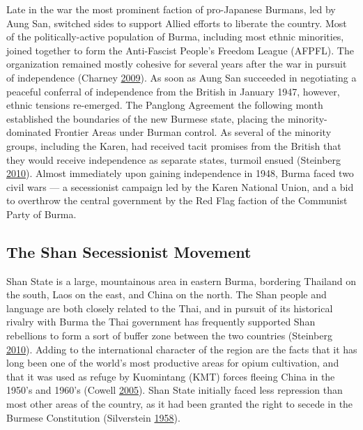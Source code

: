 \documentclass[12pt,]{book}
\theoremstyle{definition}
\theoremstyle{definition}
\theoremstyle{definition}
\theoremstyle{remark}
\begin{document}
Late in the war the most prominent faction of pro-Japanese Burmans, led
by Aung San, switched sides to support Allied efforts to liberate the
country. Most of the politically-active population of Burma, including
most ethnic minorities, joined together to form the Anti-Fascist
People's Freedom League (AFPFL). The organization remained mostly
cohesive for several years after the war in pursuit of independence
(Charney \protect\hyperlink{ref-Charney2009}{2009}). As soon as Aung San
succeeded in negotiating a peaceful conferral of independence from the
British in January 1947, however, ethnic tensions re-emerged. The
Panglong Agreement the following month established the boundaries of the
new Burmese state, placing the minority-dominated Frontier Areas under
Burman control. As several of the minority groups, including the Karen,
had received tacit promises from the British that they would receive
independence as separate states, turmoil ensued (Steinberg
\protect\hyperlink{ref-Steinberg2010}{2010}). Almost immediately upon
gaining independence in 1948, Burma faced two civil wars --- a
secessionist campaign led by the Karen National Union, and a bid to
overthrow the central government by the Red Flag faction of the
Communist Party of Burma.

\hypertarget{the-shan-secessionist-movement}{%
\subsection{The Shan Secessionist
Movement}\label{the-shan-secessionist-movement}}

Shan State is a large, mountainous area in eastern Burma, bordering
Thailand on the south, Laos on the east, and China on the north. The
Shan people and language are both closely related to the Thai, and in
pursuit of its historical rivalry with Burma the Thai government has
frequently supported Shan rebellions to form a sort of buffer zone
between the two countries (Steinberg
\protect\hyperlink{ref-Steinberg2010}{2010}). Adding to the
international character of the region are the facts that it has long
been one of the world's most productive areas for opium cultivation, and
that it was used as refuge by Kuomintang (KMT) forces fleeing China in
the 1950's and 1960's (Cowell \protect\hyperlink{ref-Cowell2005}{2005}).
Shan State initially faced less repression than most other areas of the
country, as it had been granted the right to secede in the Burmese
Constitution (Silverstein
\protect\hyperlink{ref-Silverstein1958}{1958}).
\end{document}
